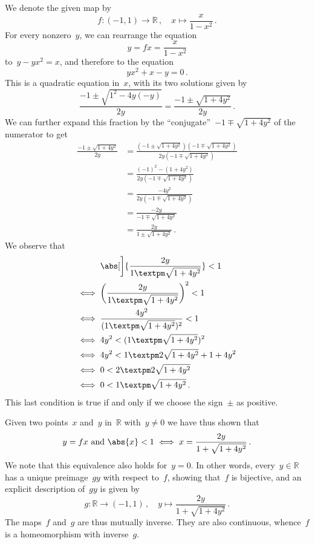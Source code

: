 We denote the given map by
\[
	f \colon (-1, 1) \to ℝ \,, \quad x \mapsto \frac{x}{1 - x^2} \,.
\]
For every nonzero~$y$, we can rearrange the equation
\[
	y = f x = \frac{x}{1 - x^2}
\]
to~$y - y x^2 = x$, and therefore to the equation
\[
	y x^2 + x - y = 0 \,.
\]
This is a quadratic equation in~$x$, with its two solutions given by
\[
	\frac{-1 ± \sqrt{1^2 - 4 y (-y)}}{2 y}
	=
	\frac{-1 ± \sqrt{1 + 4 y^2}}{2y} \,.
\]
We can further expand this fraction by the \enquote{conjugate}~$-1 ∓ \sqrt{1 + 4 y^2}$ of the numerator to get
\begin{align*}
	\frac{-1 ± \sqrt{1 + 4 y^2}}{2y}
	&=
	\frac{(-1 ± \sqrt{1 + 4 y^2})(-1 ∓ \sqrt{1 + 4 y^2})}{2y(-1 ∓ \sqrt{1 + 4 y^2})}
	\\[0.5em]
	&=
	\frac{(-1)^2 - (1 + 4 y^2)}{2 y (-1 ∓ \sqrt{1 + 4 y^2})}
	\\[0.5em]
	&=
	\frac{- 4 y^2}{2 y (-1 ∓ \sqrt{1 + 4 y^2})}
	\\[0.5em]
	&=
	\frac{- 2 y}{-1 ∓ \sqrt{1 + 4 y^2}}
	\\[0.5em]
	&=
	\frac{2 y}{1 ± \sqrt{1 + 4 y^2}} \,.
\end{align*}
We observe that
\begin{align*}
	{}&
	\abs[\bigg]{ \frac{2 y}{1 ± \sqrt{1 + 4 y^2}} } < 1
	\\
	\iff{}&
	\biggl( \frac{2 y}{1 ± \sqrt{1 + 4 y^2}} \biggr)^2 < 1
	\\
	\iff{}&
	\frac{4 y^2}{(1 ± \sqrt{1 + 4 y^2})^2} < 1
	\\
	\iff{}&
	4 y^2 < (1 ± \sqrt{1 + 4 y^2})^2
	\\
	\iff{}&
	4 y^2 < 1 ± 2 \sqrt{1 + 4 y^2} + 1 + 4 y^2
	\\
	\iff{}&
	0 < 2 ± 2 \sqrt{1 + 4 y^2}
	\\
	\iff{}&
	0 < 1 ± \sqrt{1 + 4 y^2} \,.
\end{align*}
This last condition is true if and only if we choose the sign~$±$ as positive.

Given two points~$x$ and~$y$ in~$ℝ$ with~$y ≠ 0$ we have thus shown that
\[
	\text{$y = fx$ and~$\abs{x} < 1$}
	\iff
	x = \frac{2y}{1 + \sqrt{1 + 4 y^2}} \,.
\]
We note that this equivalence also holds for~$y = 0$.
In other words, every~$y ∈ ℝ$ has a unique preimage~$g y$ with respect to~$f$, showing that~$f$ is bijective, and an explicit description of~$g y$ is given by
\[
	g \colon ℝ \to (-1, 1) \,, \quad y \mapsto \frac{2y}{1 + \sqrt{1 + 4 y^2}} \,.
\]
The maps~$f$ and~$g$ are thus mutually inverse.
They are also continuous, whence~$f$ is a homeomorphism with inverse~$g$.

